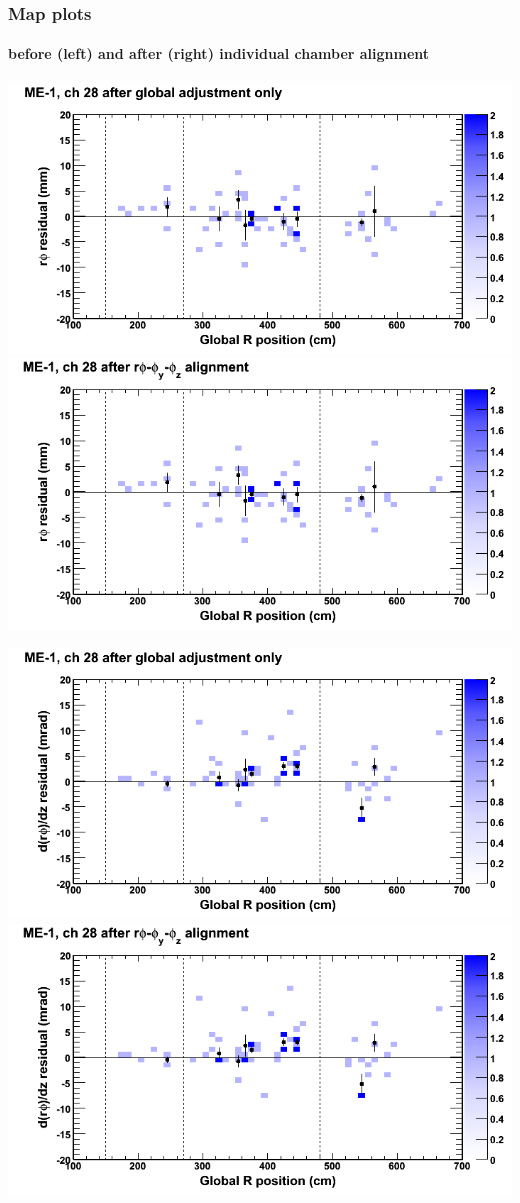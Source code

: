 \documentclass[compress]{beamer}
\begin{document}
\begin{frame}
\frametitle{Map plots}
\framesubtitle{before (left) and after (right) individual chamber alignment}
\includegraphics[width=0.5\linewidth]{ringmapplots_3dof/before_CSCvsr_mem1ch28_x.png} \includegraphics[width=0.5\linewidth]{ringmapplots_3dof/after_CSCvsr_mem1ch28_x.png}

\includegraphics[width=0.5\linewidth]{ringmapplots_3dof/before_CSCvsr_mem1ch28_dxdz.png} \includegraphics[width=0.5\linewidth]{ringmapplots_3dof/after_CSCvsr_mem1ch28_dxdz.png}
\end{frame}
\end{document}
